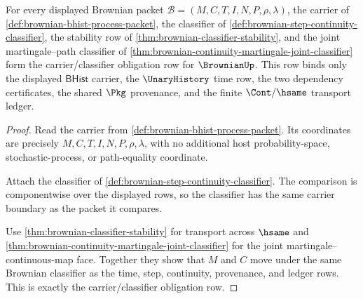 \begin{theorem}
\label{thm:brownian-carrier-classifier-obligation-package}
For every displayed Brownian packet
$\mathcal{B}=(M,C,T,I,N,P,\rho,\lambda)$, the carrier of
\autoref{def:brownian-bhist-process-packet}, the classifier of
\autoref{def:brownian-step-continuity-classifier}, the stability row of
\autoref{thm:brownian-classifier-stability}, and the joint martingale--path
classifier of \autoref{thm:brownian-continuity-martingale-joint-classifier}
form the carrier/classifier obligation row for $\BrownianUp$. This row binds
only the displayed $\mathsf{BHist}$ carrier, the $\UnaryHistory$ time row, the
two dependency certificates, the shared $\Pkg$ provenance, and the finite
$\Cont/\hsame$ transport ledger.
\end{theorem}
\begin{proof}
Read the carrier from \autoref{def:brownian-bhist-process-packet}. Its
coordinates are precisely $M,C,T,I,N,P,\rho,\lambda$, with no additional host
probability-space, stochastic-process, or path-equality coordinate.

Attach the classifier of \autoref{def:brownian-step-continuity-classifier}.
The comparison is componentwise over the displayed rows, so the classifier has
the same carrier boundary as the packet it compares.

Use \autoref{thm:brownian-classifier-stability} for transport across $\hsame$
and \autoref{thm:brownian-continuity-martingale-joint-classifier} for the
joint martingale--continuous-map face. Together they show that $M$ and $C$
move under the same Brownian classifier as the time, step, continuity,
provenance, and ledger rows. This is exactly the carrier/classifier obligation
row.
\end{proof}

